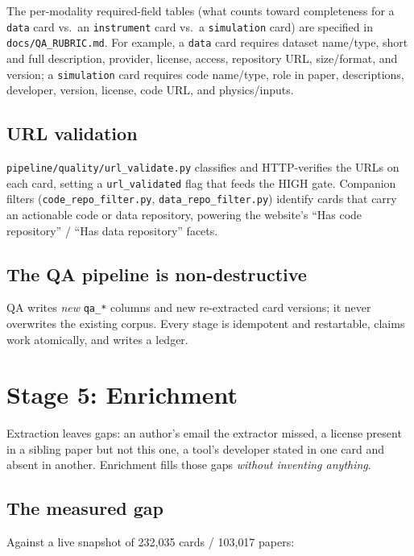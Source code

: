 \documentclass[11pt,letterpaper]{article}
\newcommand{\code}[1]{\texttt{\small #1}}
\begin{document}
\noindent The per-modality required-field tables (what counts toward completeness
for a \code{data} card vs.\ an \code{instrument} card vs.\ a \code{simulation} card)
are specified in \code{docs/QA\_RUBRIC.md}. For example, a \code{data} card requires
dataset name/type, short and full description, provider, license, access,
repository URL, size/format, and version; a \code{simulation} card requires code
name/type, role in paper, descriptions, developer, version, license, code URL, and
physics/inputs.

\subsection{URL validation}

\code{pipeline/quality/url\_validate.py} classifies and HTTP-verifies the URLs on
each card, setting a \code{url\_validated} flag that feeds the HIGH gate. Companion
filters (\code{code\_repo\_filter.py}, \code{data\_repo\_filter.py}) identify cards
that carry an actionable code or data repository, powering the website's
``Has code repository'' / ``Has data repository'' facets.

\subsection{The QA pipeline is non-destructive}

QA writes \emph{new} \code{qa\_*} columns and new re-extracted card versions; it
never overwrites the existing corpus. Every stage is idempotent and restartable,
claims work atomically, and writes a ledger.

\clearpage
\section{Stage 5: Enrichment}

Extraction leaves gaps: an author's email the extractor missed, a license present in
a sibling paper but not this one, a tool's developer stated in one card and absent in
another. Enrichment fills those gaps \emph{without inventing anything}.

\subsection{The measured gap}

Against a live snapshot of 232{,}035 cards / 103{,}017 papers:
\end{document}

